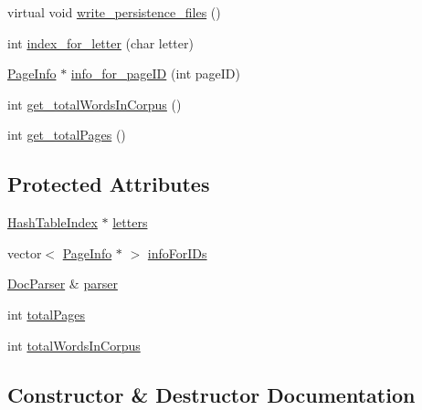 \begin{DoxyCompactItemize}
\item 
virtual void \hyperlink{class_index_interface_a0b4ec5fcc32c08959cffad3a3141dd4e}{write\+\_\+persistence\+\_\+files} ()
\item 
int \hyperlink{class_index_interface_a9a7539d9c7a48bf4d4fbe43961c0547f}{index\+\_\+for\+\_\+letter} (char letter)
\item 
\hyperlink{class_page_info}{Page\+Info} $\ast$ \hyperlink{class_index_interface_a2af7d88c3b2701be9164ba9f4a3bddb3}{info\+\_\+for\+\_\+page\+I\+D} (int page\+I\+D)
\item 
int \hyperlink{class_index_interface_a8a0132ad6e84c4340061496c615f581c}{get\+\_\+total\+Words\+In\+Corpus} ()
\item 
int \hyperlink{class_index_interface_af9edc24ac00bdf2c0e06384f890a1d8a}{get\+\_\+total\+Pages} ()
\end{DoxyCompactItemize}
\subsection*{Protected Attributes}
\begin{DoxyCompactItemize}
\item 
\hyperlink{class_hash_table_index}{Hash\+Table\+Index} $\ast$ \hyperlink{class_index_interface_a8511509bb58da989f705ba75fd5dde2d}{letters}
\item 
vector$<$ \hyperlink{class_page_info}{Page\+Info} $\ast$ $>$ \hyperlink{class_index_interface_a8400a62750faa69ff35308ff731d9ee5}{info\+For\+I\+Ds}
\item 
\hyperlink{class_doc_parser}{Doc\+Parser} \& \hyperlink{class_index_interface_a42b0d9eccd309185ed92976f72908bb9}{parser}
\item 
int \hyperlink{class_index_interface_a2df695d2b504f2e53a0bfdd6bfee31da}{total\+Pages}
\item 
int \hyperlink{class_index_interface_ab607b430e78528cdb8bb79ba4afa91d2}{total\+Words\+In\+Corpus}
\end{DoxyCompactItemize}


\subsection{Constructor \& Destructor Documentation}
\hypertarget{class_hash_table_interface_afcc090bbeda66c331a7a28623aad5d0c}{}

